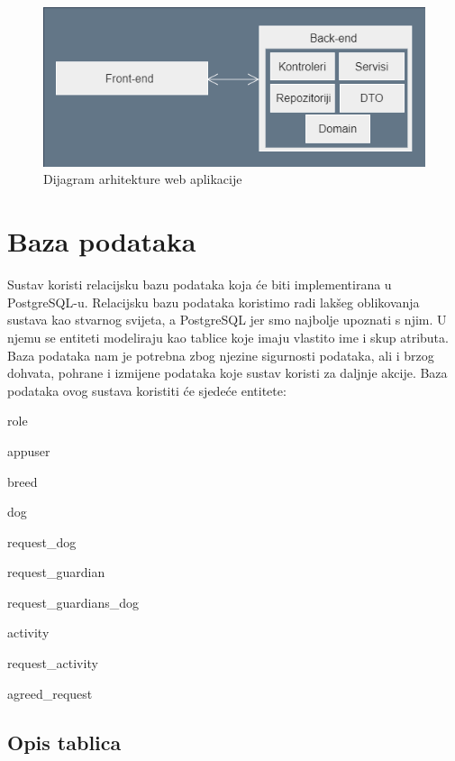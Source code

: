 		\begin{figure}[htb]
			\centering
			\includegraphics[width=14cm]{slike/arhitekturaaa}
			\caption{Dijagram arhitekture web aplikacije} 
			\label{fig:arhitektura-dijagram}
		\end{figure}
		
		\eject
				
		\section{Baza podataka}
			
			Sustav koristi relacijsku bazu podataka koja će biti implementirana u PostgreSQL-u. Relacijsku bazu podataka koristimo radi lakšeg oblikovanja sustava kao stvarnog svijeta, a PostgreSQL jer smo najbolje upoznati s njim. U njemu se entiteti modeliraju kao tablice koje imaju vlastito ime i skup atributa.\\
			Baza podataka nam je potrebna zbog njezine sigurnosti podataka, ali i brzog dohvata, pohrane i izmijene podataka koje sustav koristi za daljnje akcije.
			Baza podataka ovog sustava koristiti će sjedeće entitete:
			\begin{packed_item}
				\item role
				\item appuser
				\item breed
				\item dog
				\item request\_dog
				\item request\_guardian
				\item request\_guardians\_dog
				\item activity
				\item request\_activity
				\item agreed\_request
				
			\end{packed_item}
			
		
			\subsection{Opis tablica}
			
